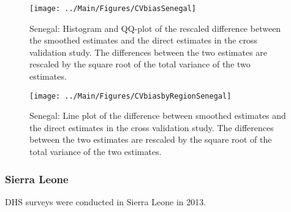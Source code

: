 \documentclass[12pt]{article}\usepackage[]{graphicx}\usepackage[]{color}
\newenvironment{knitrout}{}{} %
\begin{document}
\begin{knitrout}
\color{fgcolor}\begin{figure}[bht]

{\centering \texttt{[image: ../Main/Figures/CVbiasSenegal]} 

}

\caption[Senegal]{Senegal: Histogram and QQ-plot of the rescaled difference between the smoothed estimates and the direct estimates in the cross validation study. The differences between the two estimates are rescaled by the square root of the total variance of the two estimates.}\label{fig:unnamed-chunk-289}
\end{figure}


\end{knitrout}

\begin{knitrout}
\color{fgcolor}\begin{figure}[bht]

{\centering \texttt{[image: ../Main/Figures/CVbiasbyRegionSenegal]} 

}

\caption[Senegal]{Senegal: Line plot of the difference between smoothed estimates and the direct estimates in the cross validation study. The differences between the two estimates are rescaled by the square root of the total variance of the two estimates.}\label{fig:unnamed-chunk-290}
\end{figure}


\end{knitrout}


\clearpage
\subsubsection{Sierra Leone}





DHS surveys were conducted in Sierra Leone in 2013.
\end{document}
